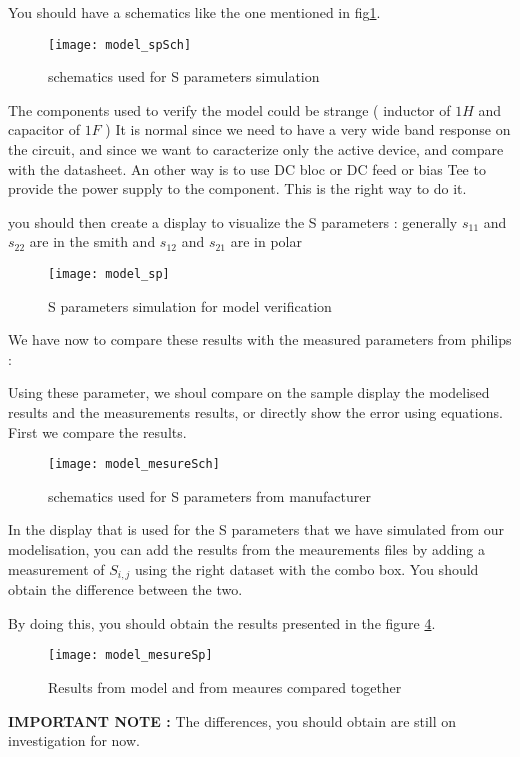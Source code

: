 You should have a schematics like the one mentioned in fig\ref{design:pa:model:spSch}.

\begin{figure}[htbp]
\begin{center}
	\texttt{[image: model\_spSch]}
	\caption{schematics used for S parameters simulation}
	\label{design:pa:model:spSch}
\end{center}
\end{figure}

The components used to verify the model could be strange ( inductor of $1H$ and capacitor of $1F$ ) It is normal since we need to have a very wide band response on the circuit, and since we want to caracterize only the active device, and compare with the datasheet. An other way is to use DC bloc or DC feed or bias Tee to provide the power supply to the component. This is the right way to do it. 

you should then create a display to visualize the S parameters : generally $s_{11}$ and $s_{22}$ are in the smith and $s_{12}$ and $s_{21}$ are in polar

\begin{figure}[htbp]
\begin{center}
	\texttt{[image: model\_sp]}
	\caption{S parameters simulation for model verification}
	\label{design:pa:model:sp}
\end{center}
\end{figure}

We have now to compare these results with the measured parameters from philips :



Using these parameter, we shoul compare on the sample display the modelised results and the measurements results, or directly show the error using equations. First we compare the results.

\begin{figure}[htbp]
\begin{center}
	\texttt{[image: model\_mesureSch]}
	\caption{schematics used for S parameters from manufacturer}
	\label{design:pa:model:spMeasSch}
\end{center}
\end{figure}

In the display that is used for the S parameters that we have simulated from our modelisation, you can add the results from the meaurements files by adding a measurement of $S_{i,j}$ using the right dataset with the combo box. You should obtain the difference between the two.

By doing this, you should obtain the results presented in the figure \ref{design:pa:model:mesureSp}.

\begin{figure}[htbp]
\begin{center}
	\texttt{[image: model\_mesureSp]}
	\caption{Results from model and from meaures compared together}
	\label{design:pa:model:mesureSp}
\end{center}
\end{figure}

\bigskip

\textbf{IMPORTANT NOTE : }The differences, you should obtain are still on investigation for now.
